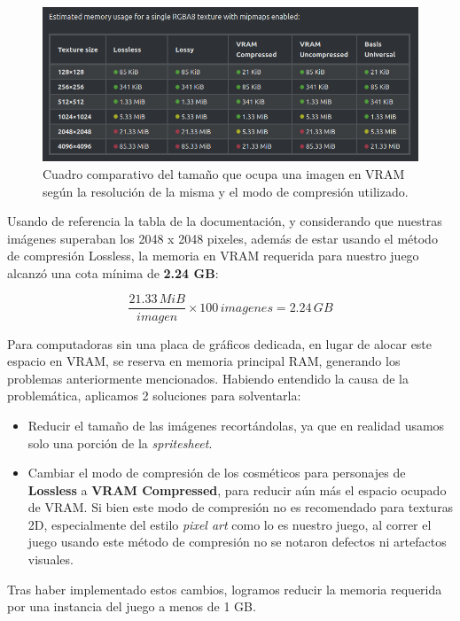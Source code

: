 \begin{figure}[htbp]
    \centering
    \includegraphics[width=1.0\textwidth]{../assets/godot-docs-images.png}
    \caption{Cuadro comparativo del tamaño que ocupa una imagen en VRAM según la resolución
             de la misma y el modo de compresión utilizado.}
\end{figure}

Usando de referencia la tabla de la documentación, y considerando que nuestras imágenes superaban
los 2048 x 2048 pixeles, además de estar usando el método de compresión Lossless,
la memoria en VRAM requerida para nuestro juego alcanzó una cota mínima de \textbf{2.24 GB}:

\[
\frac{21.33 \, MiB}{imagen} \times 100 \, imagenes = 2.24 \, GB
\]

Para computadoras sin una placa de gráficos dedicada, en lugar de alocar este espacio en VRAM,
se reserva en memoria principal RAM, generando los problemas anteriormente mencionados.
Habiendo entendido la causa de la problemática, aplicamos 2 soluciones para solventarla:

\begin{itemize}
    \item Reducir el tamaño de las imágenes recortándolas, ya que en realidad usamos solo
    una porción de la \textit{spritesheet}.
    \item Cambiar el modo de compresión de los cosméticos para personajes de \textbf{Lossless}
    a \textbf{VRAM Compressed}, para reducir aún más el espacio ocupado de VRAM. Si bien este
    modo de compresión no es recomendado para texturas 2D, especialmente del estilo
    \textit{pixel art} como lo es nuestro juego, al correr el juego usando este método de compresión
    no se notaron defectos ni artefactos visuales.
\end{itemize}

Tras haber implementado estos cambios, logramos reducir la memoria requerida por una instancia
del juego a menos de 1 GB.

